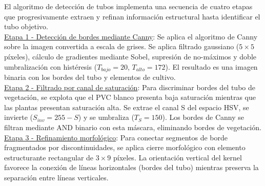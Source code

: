 El algoritmo de detección de tubos implementa una secuencia de cuatro etapas que progresivamente extraen y refinan información estructural hasta identificar el tubo objetivo.\\

\underline{Etapa 1 - Detección de bordes mediante Canny}: Se aplica el algoritmo de Canny sobre la imagen convertida a escala de grises. Se aplica filtrado gaussiano ($5 \times 5$ píxeles), cálculo de gradientes mediante Sobel, supresión de no-máximos y doble umbralización con histéresis ($T_{bajo} = 20$, $T_{alto} = 172$). El resultado es una imagen binaria con los bordes del tubo y elementos de cultivo.\\

\underline{Etapa 2 - Filtrado por canal de saturación}: Para discriminar bordes del tubo de vegetación, se explota que el PVC blanco presenta baja saturación mientras que las plantas presentan saturación alta. Se extrae el canal S del espacio HSV, se invierte ($S_{inv} = 255 - S$) y se umbraliza ($T_S = 150$). Los bordes de Canny se filtran mediante AND binario con esta máscara, eliminando bordes de vegetación.\\

\underline{Etapa 3 - Refinamiento morfológico}: Para conectar segmentos de borde fragmentados por discontinuidades, se aplica cierre morfológico con elemento estructurante rectangular de $3 \times 9$ píxeles. La orientación vertical del kernel favorece la conexión de líneas horizontales (bordes del tubo) mientras preserva la separación entre líneas verticales.

